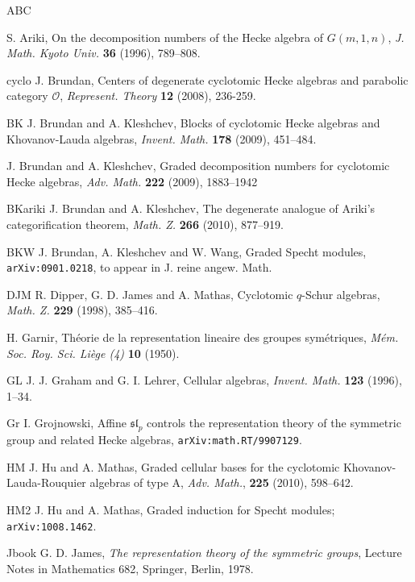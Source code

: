 \documentclass[twoside,11pt,reqno]{amsart}
\numberwithin{equation}{section}
\theoremstyle{definition}  %
\newcommand{\0}{{\bar 0}}
\newcommand{\1}{{\bar 1}}
\begin{document}
\begin{thebibliography}{ABC}

S. Ariki, On the decomposition numbers of the Hecke algebra of $G(m,1,n)$, {\em J. Math. Kyoto Univ.} {\bf 36} (1996), 789--808.

\bibitem%
{cyclo}
J. Brundan, Centers of degenerate cyclotomic Hecke algebras and parabolic category $\mathcal O$, {\em Represent. Theory} {\bf 12} (2008), 236-259.

\bibitem%
{BK}
J. Brundan and A. Kleshchev,
Blocks of cyclotomic Hecke algebras and Khovanov-Lauda algebras, 
{\em Invent. Math.} {\bf 178} (2009), 451--484.

J. Brundan and A. Kleshchev, Graded decomposition numbers for cyclotomic Hecke algebras, {\em Adv. Math.} {\bf 222} (2009), 1883--1942

\bibitem%
{BKariki}
J. Brundan and A. Kleshchev,
The degenerate analogue of Ariki's categorification theorem, {\em Math. Z.} {\bf 266} (2010), 877--919.



\bibitem%
{BKW}
J. Brundan, A. Kleshchev and W. Wang,
Graded Specht modules,
 {\tt arXiv:0901.0218}, to appear in {J. reine angew. Math.}
 

\bibitem%
{DJM}
R. Dipper, G. D. James and A. Mathas, Cyclotomic $q$-Schur algebras, {\em Math. Z.} {\bf 229} (1998), 385--416. 

H. Garnir, Th\'eorie de la representation lineaire des groupes sym\'etriques, {\em M\'em. Soc. Roy. Sci. Li\`ege (4)} {\bf 10} (1950).  

\bibitem%
{GL}
 J. J. Graham and G. I. Lehrer,
Cellular algebras, {\em Invent. Math.} {\bf 123} (1996), 1--34.

\bibitem%
{Gr}
I. Grojnowski, Affine $\mathfrak{sl}_p$ controls the representation theory of the symmetric group and related Hecke algebras, {\tt arXiv:math.RT/9907129}. 



\bibitem%
{HM}
J. Hu and A. Mathas, Graded cellular bases for the cyclotomic Khovanov-Lauda-Rouquier algebras of
type A, {\em Adv. Math.}, {\bf 225} (2010), 598--642.


\bibitem%
{HM2}
J. Hu and A. Mathas, Graded induction for Specht modules;
\texttt{arXiv:1008.1462}.

\bibitem%
{Jbook} G. D. James, {\em  The representation theory of the symmetric groups}, Lecture Notes in Mathematics 682, Springer, Berlin, 1978.


\end{thebibliography}
\end{document}
